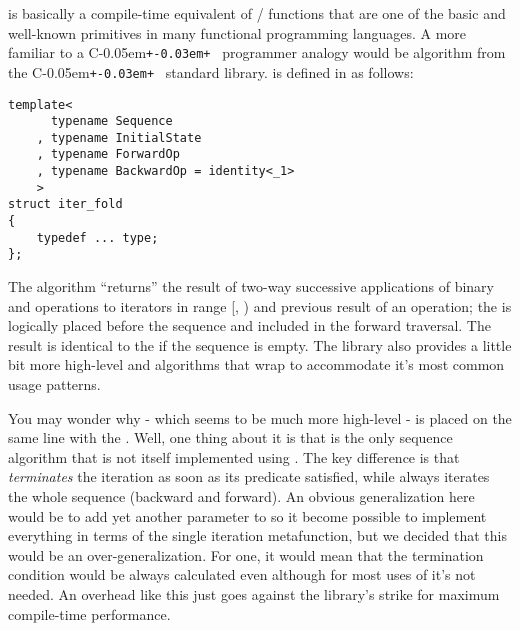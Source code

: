 \documentclass{kapproc}
\newcommand{\Cpp}{C\kern-0.05em\texttt{+\kern-0.03em+}%
}
\begin{document}
 is basically a compile-time equivalent of 
/ functions that are one of the basic 
and well-known primitives in many functional programming 
languages. A more familiar to a \Cpp\ programmer analogy would 
be  algorithm from the \Cpp\ standard 
library.  is defined in  
as follows:

{\small
\begin{codesamp}\begin{verbatim}
template<
      typename Sequence
    , typename InitialState
    , typename ForwardOp
    , typename BackwardOp = identity<_1>
    >
struct iter_fold
{
    typedef ... type;
};
\end{verbatim}
\end{codesamp}
}


The algorithm ``returns'' the result of two-way successive 
applications of binary  and 
operations to iterators in range 
[, ) 
and previous result of an operation; 
the  is logically placed before the 
sequence and included in the forward traversal. The result 
 is identical to the  if the 
sequence is empty. 
The library also provides a little bit more high-level 
 and  algorithms that wrap 
 to accommodate it's most common usage 
patterns.

You may wonder why  - which seems to be much 
more high-level - is placed on the same line with the 
. Well, one thing about it is that 
 is the only sequence algorithm that is not 
itself implemented using . The key difference 
is that  \emph{terminates} the iteration as 
soon as its predicate satisfied, while  
always iterates the whole sequence (backward and forward). 
An obvious generalization here would be to add yet another 
parameter to  so it become possible to 
implement everything in terms of the single iteration 
metafunction, but we decided that this would be an 
over-generalization. For one, it would mean that the 
termination condition would be always calculated even 
although for most uses of  it's not needed. 
An overhead like this just goes against the library's strike 
for maximum compile-time performance.
\end{document}
